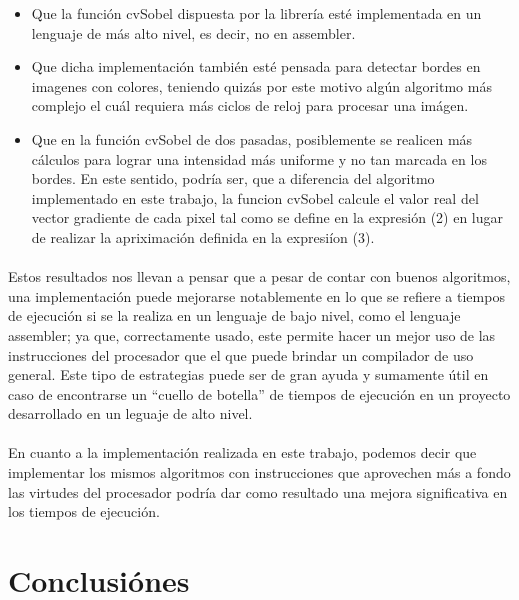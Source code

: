 \documentclass[11pt, a4paper]{article}
\begin{document}
\begin{itemize}
\item Que la funci\'on cvSobel dispuesta por la librer\'ia est\'e implementada en un lenguaje de m\'as alto nivel, es decir, no en assembler.
\item Que dicha implementaci\'on tambi\'en est\'e pensada para detectar bordes en imagenes con colores, teniendo quiz\'as por este motivo alg\'un algoritmo m\'as complejo el cu\'al requiera m\'as ciclos de reloj para procesar una im\'agen.
\item Que en la funci\'on cvSobel de dos pasadas, posiblemente se realicen m\'as c\'alculos para lograr una intensidad m\'as uniforme y no tan marcada en los bordes. En este sentido, podr\'ia ser, que a diferencia del algoritmo implementado en este trabajo, la funcion cvSobel calcule el valor real del vector gradiente de cada pixel tal como se define en la expresi\'on (2) en lugar de realizar la apriximaci\'on definida en la expresi\'ion (3).

\end{itemize}

\paragraph{}
Estos resultados nos llevan a pensar que a pesar de contar con buenos algoritmos, una implementaci\'on puede mejorarse notablemente en lo que se refiere a tiempos de ejecuci\'on si se la realiza en un lenguaje de bajo nivel, como el lenguaje assembler; ya que, correctamente usado, este permite hacer un mejor uso de las instrucciones del procesador que el que puede brindar un compilador de uso general. Este tipo de estrategias puede ser de gran ayuda y sumamente \'util en caso de encontrarse un ``cuello de botella'' de tiempos de ejecuci\'on en un proyecto desarrollado en un leguaje de alto nivel.

\paragraph{}
En cuanto a la implementaci\'on realizada en este trabajo, podemos decir que implementar los mismos algoritmos con instrucciones que aprovechen m\'as a fondo las virtudes del procesador podr\'ia dar como resultado una mejora significativa en los tiempos de ejecuci\'on.


\newpage

\section{Conclusi\'ones}
\end{document}
